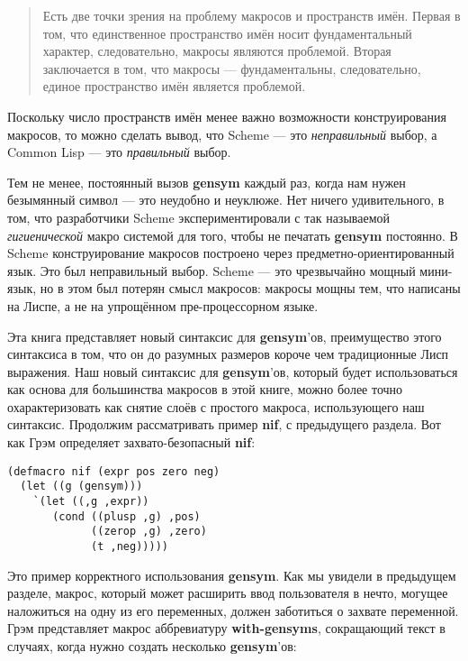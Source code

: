 \begin{quote}
Есть две точки зрения на проблему макросов и пространств имён. Первая в том, что единственное пространство имён носит фундаментальный характер, следовательно, макросы являются проблемой. Вторая заключается в том, что макросы --- фундаментальны, следовательно, единое пространство имён является проблемой.
\end{quote}

Поскольку число пространств имён менее важно возможности конструирования макросов, то можно сделать вывод, что Scheme --- это \emph{неправильный} выбор, а Common Lisp --- это \emph{правильный} выбор.

Тем не менее, постоянный вызов \textbf{gensym} каждый раз, когда нам нужен безымянный символ --- это неудобно и неуклюже. Нет ничего удивительного, в том, что разработчики Scheme экспериментировали с так называемой \emph{гигиенической} макро системой для того, чтобы не печатать \textbf{gensym} постоянно. В Scheme конструирование макросов построено через предметно-ориентированный язык. Это был неправильный выбор. Scheme --- это чрезвычайно мощный мини-язык, но в этом был потерян смысл макросов: макросы мощны тем, что написаны на Лиспе, а не на упрощённом пре-процессорном языке.

Эта книга представляет новый синтаксис для \textbf{gensym}'ов, преимущество этого синтаксиса в том, что он до разумных размеров короче чем традиционные Лисп выражения. Наш новый синтаксис для \textbf{gensym}'ов, который будет использоваться как основа для большинства макросов в этой книге, можно более точно охарактеризовать как снятие слоёв с простого макроса, использующего наш синтаксис. Продолжим рассматривать пример \textbf{nif}, с предыдущего раздела. Вот как Грэм определяет захвато-безопасный \textbf{nif}:

\begin{verbatim}
(defmacro nif (expr pos zero neg)
  (let ((g (gensym)))
    `(let ((,g ,expr))
       (cond ((plusp ,g) ,pos)
             ((zerop ,g) ,zero)
             (t ,neg)))))
\end{verbatim}

Это пример корректного использования \textbf{gensym}. Как мы увидели в предыдущем разделе, макрос, который может расширить ввод пользователя в нечто, могущее наложиться на одну из его переменных, должен заботиться о захвате переменной. Грэм представляет макрос аббревиатуру \textbf{with-gensyms}, сокращающий текст в случаях, когда нужно создать несколько \textbf{gensym}'ов:

